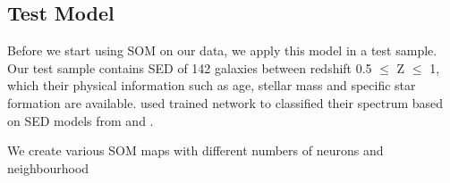  \subsection{Test Model}
 \label{sec: test model}
    Before we start using SOM on our data, we apply this model in a test sample. 
    Our test sample contains SED of 142 galaxies between redshift 0.5 $ \leq$ Z $\leq $ 1, which their physical information such as age, stellar mass and specific star formation are available. 
    \cite{Hossein12} used trained network to classified their spectrum based on SED models from \cite{Kinney96} and \cite{Coleman80}.
    
    We create various SOM maps with different numbers of neurons and neighbourhood 
